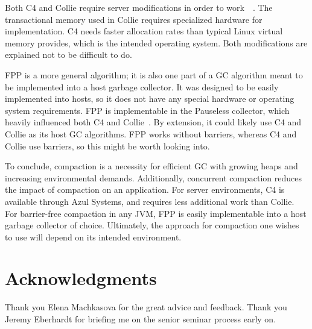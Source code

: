 \documentclass{sig-alternate}
\begin{document}
Both C4 and Collie require server modifications in order
to work~\cite{Tene:C4}~\cite{Iyengar:Collie}. The transactional memory 
used in Collie requires specialized hardware for implementation.
C4 needs faster allocation rates than typical Linux virtual memory provides,
which is the intended operating system. Both modifications are explained not to be difficult to do.

FPP is a more general algorithm; it is also one part of a GC algorithm
meant to be implemented into a host garbage collector. It was designed
to be easily implemented into hosts, so it does not have any special hardware or operating
system requirements. FPP is implementable in the Pauseless collector, which heavily influenced
both C4 and Collie~\cite{Osterlund:FPP}. By extension, it could likely use C4 and Collie as
its host GC algorithms. FPP works without barriers, whereas C4 and Collie use barriers, so
this might be worth looking into.

To conclude, compaction is a necessity for efficient GC with growing heaps and
increasing environmental demands. Additionally, concurrent compaction reduces the impact of compaction
on an application. For server environments, C4 is available through Azul Systems, and requires
less additional work than Collie. For barrier-free compaction in any JVM, FPP 
is easily implementable into a host garbage collector of choice. Ultimately,
the approach for compaction one wishes to use will depend on its intended environment.



\section*{Acknowledgments}
\label{sec:acknowledgments}


Thank you Elena Machkasova for the great advice and feedback.
Thank you Jeremy Eberhardt for briefing me on the senior seminar process early on.



  
\end{document}
